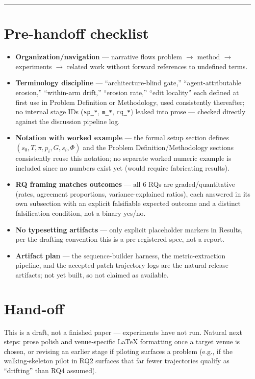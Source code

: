 \documentclass[11pt]{article}
\begin{document}
\vspace{1em}
\hrule
\vspace{1em}

\section*{Pre-handoff checklist}
\begin{itemize}[leftmargin=1.4em]
\item \textbf{Organization/navigation} --- narrative flows problem $\to$ method $\to$ experiments $\to$ related work without forward references to undefined terms.
\item \textbf{Terminology discipline} --- ``architecture-blind gate,'' ``agent-attributable erosion,'' ``within-arm drift,'' ``erosion rate,'' ``edit locality'' each defined at first use in Problem Definition or Methodology, used consistently thereafter; no internal stage IDs (\texttt{sp\_*}, \texttt{m\_*}, \texttt{rq\_*}) leaked into prose --- checked directly against the discussion pipeline log.
\item \textbf{Notation with worked example} --- the formal setup section defines $(s_0, T, \pi, p_i, G, s_i, \Phi)$ and the Problem Definition/Methodology sections consistently reuse this notation; no separate worked numeric example is included since no numbers exist yet (would require fabricating results).
\item \textbf{RQ framing matches outcomes} --- all 6 RQs are graded/quantitative (rates, agreement proportions, variance-explained ratios), each answered in its own subsection with an explicit falsifiable expected outcome and a distinct falsification condition, not a binary yes/no.
\item \textbf{No typesetting artifacts} --- only explicit placeholder markers in Results, per the drafting convention this is a pre-registered spec, not a report.
\item \textbf{Artifact plan} --- the sequence-builder harness, the metric-extraction pipeline, and the accepted-patch trajectory logs are the natural release artifacts; not yet built, so not claimed as available.
\end{itemize}

\section*{Hand-off}
This is a draft, not a finished paper --- experiments have not run. Natural next steps: prose polish and venue-specific LaTeX formatting once a target venue is chosen, or revising an earlier stage if piloting surfaces a problem (e.g., if the walking-skeleton pilot in RQ2 surfaces that far fewer trajectories qualify as ``drifting'' than RQ4 assumed).
\end{document}
